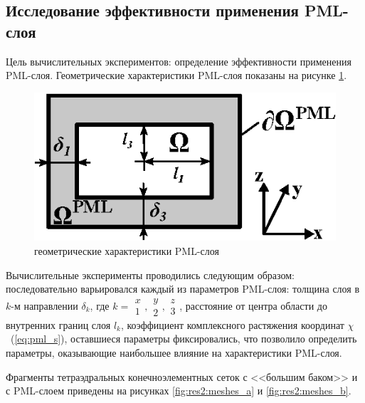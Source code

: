 \documentclass[a4paper,12pt]{article}
\begin{document}
\subsection{Исследование эффективности применения PML-слоя}
Цель вычислительных экспериментов: определение эффективности применения PML-слоя. Геометрические характеристики PML-слоя показаны на рисунке \ref{fig:res2:info_2d}.
\begin{figure}[H]
	\centering
	\includegraphics[scale=1]{research-2/info_2d/info_2d_2.eps}
	\caption{геометрические характеристики PML-слоя}
	\label{fig:res2:info_2d}
\end{figure}

Вычислительные эксперименты проводились следующим образом: последовательно варьировался каждый из параметров PML-слоя: толщина слоя в $k$-м направлении $\delta_k$, где $k = \begin{smallmatrix}x\\1\end{smallmatrix},\begin{smallmatrix}y\\2\end{smallmatrix},\begin{smallmatrix}z\\3\end{smallmatrix}$, расстояние от центра области до внутренних границ слоя $l_k$, коэффициент комплексного растяжения координат $\chi$~(\ref{eq:pml_s}), оставшиеся параметры фиксировались, что позволило определить параметры, оказывающие наибольшее влияние на характеристики PML-слоя.

Фрагменты тетраэдральных конечноэлементных сеток с <<большим баком>> и с PML-слоем приведены на рисунках \ref{fig:res2:meshes_a} и \ref{fig:res2:meshes_b}.
\end{document}
